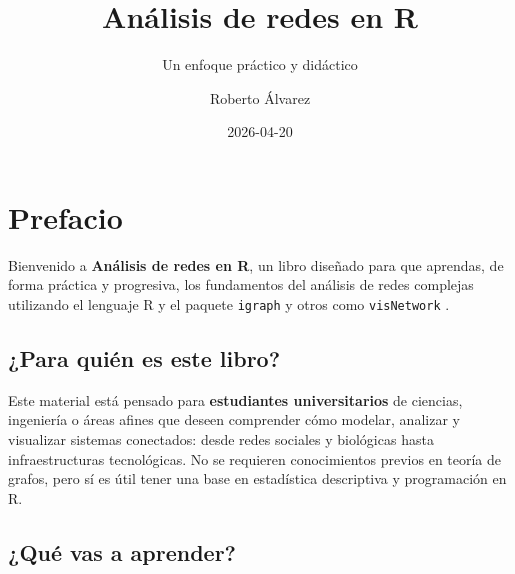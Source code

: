 \documentclass[
  letterpaper,
  DIV=11,
  numbers=noendperiod]{scrreprt}
\title{Análisis de redes en R}
\subtitle{Un enfoque práctico y didáctico}
\author{Roberto Álvarez}
\date{2026-04-20}
\renewcommand*\contentsname{Table of contents}
\newcommand\contentsname{Table of contents}
\begin{document}
\maketitle

\renewcommand*\contentsname{Table of contents}
{
\hypersetup{linkcolor=}
\setcounter{tocdepth}{2}
\tableofcontents
}


\chapter*{Prefacio}\label{prefacio}


Bienvenido a \textbf{Análisis de redes en R}, un libro diseñado para que
aprendas, de forma práctica y progresiva, los fundamentos del análisis
de redes complejas utilizando el lenguaje R y el paquete \texttt{igraph}
y otros como \texttt{visNetwork} .

\section*{¿Para quién es este libro?}\label{para-quiuxe9n-es-este-libro}


Este material está pensado para \textbf{estudiantes universitarios} de
ciencias, ingeniería o áreas afines que deseen comprender cómo modelar,
analizar y visualizar sistemas conectados: desde redes sociales y
biológicas hasta infraestructuras tecnológicas. No se requieren
conocimientos previos en teoría de grafos, pero sí es útil tener una
base en estadística descriptiva y programación en R.

\section*{¿Qué vas a aprender?}\label{quuxe9-vas-a-aprender}

\end{document}
